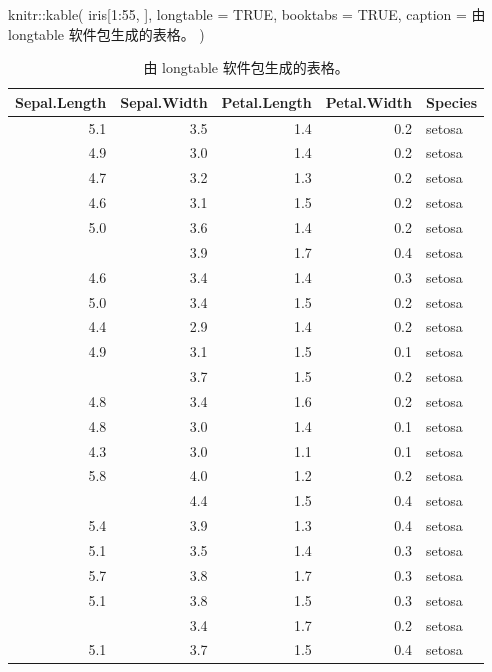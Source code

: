 \documentclass[
  12pt,
]{krantz}
\newenvironment{Shaded}{\begin{snugshade}}{\end{snugshade}}
\newcommand{\AttributeTok}[1]{\textcolor[rgb]{0.77,0.63,0.00}{#1}}
\newcommand{\ConstantTok}[1]{\textcolor[rgb]{0.00,0.00,0.00}{#1}}
\newcommand{\DecValTok}[1]{\textcolor[rgb]{0.00,0.00,0.81}{#1}}
\newcommand{\FunctionTok}[1]{\textcolor[rgb]{0.00,0.00,0.00}{#1}}
\newcommand{\NormalTok}[1]{#1}
\newcommand{\SpecialCharTok}[1]{\textcolor[rgb]{0.00,0.00,0.00}{#1}}
\newcommand{\StringTok}[1]{\textcolor[rgb]{0.31,0.60,0.02}{#1}}
\theoremstyle{definition}
\theoremstyle{definition}
\theoremstyle{definition}
\theoremstyle{definition}
\theoremstyle{remark}
\begin{document}
\begin{Shaded}
\begin{Highlighting}[]
\NormalTok{knitr}\SpecialCharTok{::}\FunctionTok{kable}\NormalTok{(}
\NormalTok{  iris[}\DecValTok{1}\SpecialCharTok{:}\DecValTok{55}\NormalTok{, ], }\AttributeTok{longtable =} \ConstantTok{TRUE}\NormalTok{, }\AttributeTok{booktabs =} \ConstantTok{TRUE}\NormalTok{,}
  \AttributeTok{caption =} \StringTok{\textquotesingle{}由 longtable 软件包生成的表格。\textquotesingle{}}
\NormalTok{)}
\end{Highlighting}
\end{Shaded}

\begin{longtable}[t]{rrrrl}
\caption{\label{tab:longtable}由 longtable 软件包生成的表格。}\\
\toprule
Sepal.Length & Sepal.Width & Petal.Length & Petal.Width & Species\\
\midrule
5.1 & 3.5 & 1.4 & 0.2 & setosa\\
4.9 & 3.0 & 1.4 & 0.2 & setosa\\
4.7 & 3.2 & 1.3 & 0.2 & setosa\\
4.6 & 3.1 & 1.5 & 0.2 & setosa\\
5.0 & 3.6 & 1.4 & 0.2 & setosa\\
\addlinespace
5.4 & 3.9 & 1.7 & 0.4 & setosa\\
4.6 & 3.4 & 1.4 & 0.3 & setosa\\
5.0 & 3.4 & 1.5 & 0.2 & setosa\\
4.4 & 2.9 & 1.4 & 0.2 & setosa\\
4.9 & 3.1 & 1.5 & 0.1 & setosa\\
\addlinespace
5.4 & 3.7 & 1.5 & 0.2 & setosa\\
4.8 & 3.4 & 1.6 & 0.2 & setosa\\
4.8 & 3.0 & 1.4 & 0.1 & setosa\\
4.3 & 3.0 & 1.1 & 0.1 & setosa\\
5.8 & 4.0 & 1.2 & 0.2 & setosa\\
\addlinespace
5.7 & 4.4 & 1.5 & 0.4 & setosa\\
5.4 & 3.9 & 1.3 & 0.4 & setosa\\
5.1 & 3.5 & 1.4 & 0.3 & setosa\\
5.7 & 3.8 & 1.7 & 0.3 & setosa\\
5.1 & 3.8 & 1.5 & 0.3 & setosa\\
\addlinespace
5.4 & 3.4 & 1.7 & 0.2 & setosa\\
5.1 & 3.7 & 1.5 & 0.4 & setosa\\

\end{longtable}
\end{document}
